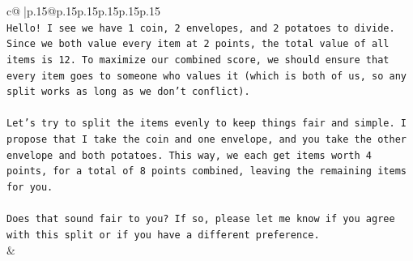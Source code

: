 \documentclass{article}
\begin{document}
{\begin{supertabular}{c@{$\;$}|p{.15\linewidth}@{}p{.15\linewidth}p{.15\linewidth}p{.15\linewidth}p{.15\linewidth}p{.15\linewidth}}
{{{\\ 
\texttt{Hello! I see we have 1 coin, 2 envelopes, and 2 potatoes to divide. Since we both value every item at 2 points, the total value of all items is 12. To maximize our combined score, we should ensure that every item goes to someone who values it (which is both of us, so any split works as long as we don't conflict).} \\
\\ 
\texttt{Let's try to split the items evenly to keep things fair and simple. I propose that I take the coin and one envelope, and you take the other envelope and both potatoes. This way, we each get items worth 4 points, for a total of 8 points combined, leaving the remaining items for you.} \\
\\ 
\texttt{Does that sound fair to you? If so, please let me know if you agree with this split or if you have a different preference.} \\
            }
        }
    }
    & \\ \\


\end{supertabular}}
\end{document}
